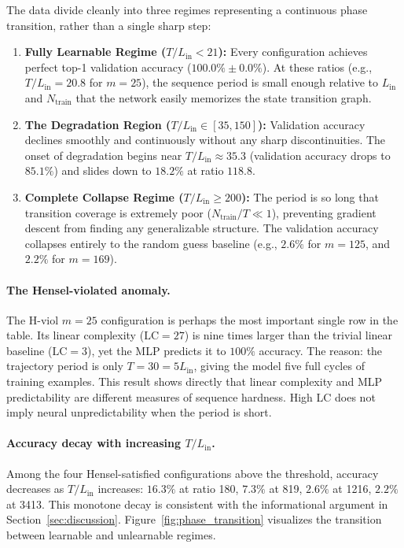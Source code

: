 \documentclass[11pt]{article}
\theoremstyle{plain}
\theoremstyle{definition}
\newcommand{\LC}{\mathrm{LC}}
\begin{document}
The data divide cleanly into three regimes representing a continuous phase transition, rather than a single sharp step:
\begin{enumerate}[leftmargin=2em,itemsep=2pt]
\item \textbf{Fully Learnable Regime ($T/L_{\mathrm{in}} < 21$):} Every configuration achieves perfect top-1 validation accuracy ($100.0\% \pm 0.0\%$). At these ratios (e.g., $T/L_{\mathrm{in}} = 20.8$ for $m=25$), the sequence period is small enough relative to $L_{\mathrm{in}}$ and $N_{\mathrm{train}}$ that the network easily memorizes the state transition graph.
\item \textbf{The Degradation Region ($T/L_{\mathrm{in}} \in [35, 150]$):} Validation accuracy declines smoothly and continuously without any sharp discontinuities. The onset of degradation begins near $T/L_{\mathrm{in}} \approx 35.3$ (validation accuracy drops to $85.1\%$) and slides down to $18.2\%$ at ratio $118.8$.
\item \textbf{Complete Collapse Regime ($T/L_{\mathrm{in}} \ge 200$):} The period is so long that transition coverage is extremely poor ($N_{\mathrm{train}}/T \ll 1$), preventing gradient descent from finding any generalizable structure. The validation accuracy collapses entirely to the random guess baseline (e.g., $2.6\%$ for $m=125$, and $2.2\%$ for $m=169$).
\end{enumerate}

\paragraph{The Hensel-violated anomaly.} The H-viol $m=25$ configuration is perhaps the most important single row in the table. Its linear complexity ($\LC = 27$) is nine times larger than the trivial linear baseline ($\LC = 3$), yet the MLP predicts it to $100\%$ accuracy. The reason: the trajectory period is only $T = 30 = 5 L_{\mathrm{in}}$, giving the model five full cycles of training examples. This result shows directly that linear complexity and MLP predictability are different measures of sequence hardness. High LC does not imply neural unpredictability when the period is short.

\paragraph{Accuracy decay with increasing $T/L_{\mathrm{in}}$.} Among the four Hensel-satisfied configurations above the threshold, accuracy decreases as $T/L_{\mathrm{in}}$ increases: $16.3\%$ at ratio 180, $7.3\%$ at 819, $2.6\%$ at 1216, $2.2\%$ at 3413. This monotone decay is consistent with the informational argument in Section~\ref{sec:discussion}. Figure~\ref{fig:phase_transition} visualizes the transition between learnable and unlearnable regimes.
\end{document}
